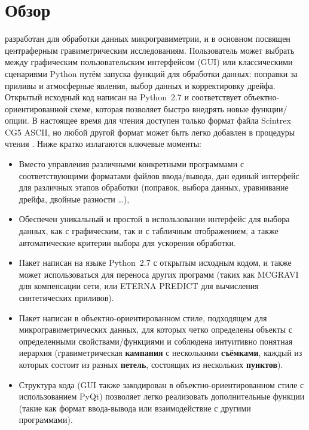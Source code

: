 \chapter[Обзор]{Обзор}
\label{overview}

\pg{} \cite{hector_2016} разработан для обработки данных микрогравиметрии, и в
основном посвящен центраферным гравиметрическим исследованиям.  Пользователь
может выбрать между графическим пользовательским интерфейсом (GUI) или
классическими сценариями Python путём запуска функций \pg{} для обработки
данных: поправки за приливы и атмосферные явления, выбор данных и корректировку
дрейфа.  Открытый исходный код написан на Python~2.7 и соответствует
объектно-ориентированной схеме, которая позволяет быстро внедрять новые
функции/опции. В настоящее время для чтения доступен только формат файла
Scintrex CG5 ASCII, но любой другой формат может быть легко добавлен в процедуры
чтения \pg{}. Ниже кратко излагаются ключевые моменты:
\begin{itemize}
    \item Вместо управления различными конкретными программами с
    соответствующими форматами файлов ввода/вывода, дан единый интерфейс для
    различных этапов обработки (поправок, выбора данных, уравнивание дрейфа,
    двойные разности \dots),

    \item Обеспечен уникальный и простой в использовании интерфейс для выбора
    данных, как с графическим, так и с табличным отображением, а также
    автоматические критерии выбора для ускорения обработки.
    
    \item Пакет написан на языке Python~2.7 с открытым исходным кодом, и также
    может использоваться для переноса других программ (таких как MCGRAVI для
    компенсации сети, или ETERNA PREDICT для вычисления синтетических приливов).
    
    \item Пакет написан в объектно-ориентированном стиле, подходящем для
    микрогравиметрических данных, для которых четко определены объекты с
    определенными свойствами/функциями и соблюдена интуитивно понятная иерархия
    (гравиметрическая \textbf{кампания} с несколькими \textbf{съёмками}, каждый
    из которых состоит из разных \textbf{петель}, состоящих из нескольких
    \textbf{пунктов}).
    
    \item Структура кода (GUI также закодирован в объектно-ориентированном стиле
    с использованием PyQt) позволяет легко реализовать дополнительные функции
    (такие как формат ввода-вывода или взаимодействие с другими программами).

\end{itemize}

